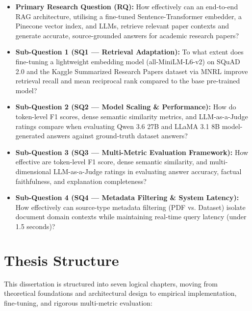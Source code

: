 \begin{itemize}
    \item \textbf{Primary Research Question (RQ):} How effectively can an end-to-end RAG architecture, utilising a fine-tuned Sentence-Transformer embedder, a Pinecone vector index, and LLMs, retrieve relevant paper contexts and generate accurate, source-grounded answers for academic research papers?
    \item \textbf{Sub-Question 1 (SQ1 — Retrieval Adaptation):} To what extent does fine-tuning a lightweight embedding model (all-MiniLM-L6-v2) on SQuAD 2.0 and the Kaggle Summarized Research Papers dataset via MNRL improve retrieval recall and mean reciprocal rank compared to the base pre-trained model?
    \item \textbf{Sub-Question 2 (SQ2 — Model Scaling \& Performance):} How do token-level F1 scores, dense semantic similarity metrics, and LLM-as-a-Judge ratings compare when evaluating Qwen 3.6 27B and LLaMA 3.1 8B model-generated answers against ground-truth dataset answers?
    \item \textbf{Sub-Question 3 (SQ3 — Multi-Metric Evaluation Framework):} How effective are token-level F1 score, dense semantic similarity, and multi-dimensional LLM-as-a-Judge ratings in evaluating answer accuracy, factual faithfulness, and explanation completeness?
    \item \textbf{Sub-Question 4 (SQ4 — Metadata Filtering \& System Latency):} How effectively can source-type metadata filtering (PDF vs. Dataset) isolate document domain contexts while maintaining real-time query latency (under 1.5 seconds)?
\end{itemize}

\section{Thesis Structure}

This dissertation is structured into seven logical chapters, moving from theoretical foundations and architectural design to empirical implementation, fine-tuning, and rigorous multi-metric evaluation:


